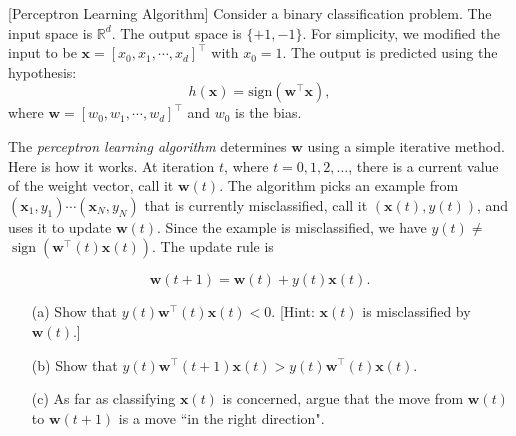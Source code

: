\item {} [Perceptron Learning Algorithm]
Consider a binary classification problem. The input space is $\mathbb{R}^{d}$. The output space is $\{ +1, -1 \}$. For simplicity, we modified the input to be $\mathbf{x} = [x_0, x_1, \cdots, x_d]^{\top}$ with $x_0=1$. The output is predicted using the hypothesis:
\begin{equation}
    h(\mathbf{x}) = \text{sign}(\mathbf{w}^{\top}\mathbf{x}),
\end{equation}
where $\mathbf{w} = [w_0, w_1, \cdots, w_d]^{\top}$ and $w_0$ is the bias.

The \textit{perceptron learning algorithm} determines $\mathbf{w}$ using a simple iterative method. Here is how it works. At iteration $t$, where $t=0,1,2, \ldots$, there is a current value of the weight vector, call it $\mathbf{w}(t)$. The algorithm picks an example from $\left(\mathbf{x}_1, y_1\right) \cdots\left(\mathbf{x}_N, y_N\right)$ that is currently misclassified, call it $(\mathbf{x}(t), y(t))$, and uses it to update $\mathbf{w}(t)$. Since the example is misclassified, we have $y(t) \neq$ $\operatorname{sign}\left(\mathbf{w}^{\top}(t) \mathbf{x}(t)\right)$. The update rule is

\begin{equation}
    \mathbf{w}(t+1)=\mathbf{w}(t)+y(t) \mathbf{x}(t).
\end{equation}

\begin{itemize}
\item[(a)] Show that $y(t) \mathbf{w}^{\top}(t) \mathbf{x}(t)<0$. [Hint: $\mathbf{x}(t)$ is misclassified by $\mathbf{w}(t)$.] ~
\item[(b)] Show that $y(t) \mathbf{w}^{\top}(t+1) \mathbf{x}(t)>y(t) \mathbf{w}^{\top}(t) \mathbf{x}(t)$. ~
\item[(c)]   As far as classifying $\mathbf{x}(t)$ is concerned, argue that the move from $\mathbf{w}(t)$ to $\mathbf{w}(t+1)$ is a move ``in the right direction". ~
\end{itemize}

\solution











\newpage